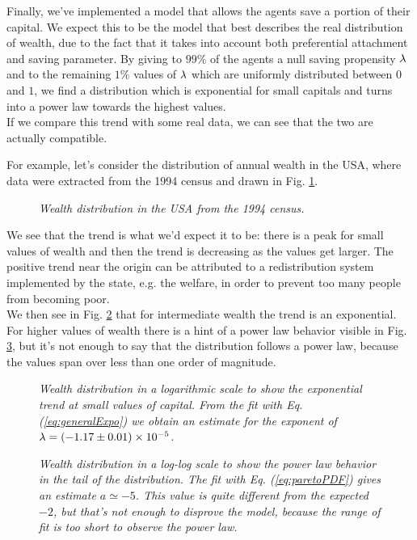 Finally, we've implemented a model that allows the agents save a portion of their capital.
We expect this to be the model that best describes the real distribution of wealth, due to the fact that it takes into account both preferential attachment and saving parameter.
By giving to $99 \%$ of the agents a null saving propensity $\lambda$ and to the remaining $1 \%$ values of $\lambda$ which are uniformly distributed between $0$ and $1$, we find a distribution which is exponential for small capitals and turns into a power law towards the highest values. \\
If we compare this trend with some real data, we can see that the two are actually compatible.

For example, let's consider the distribution of annual wealth in the USA, where data were extracted from the 1994 census and drawn in Fig. \ref{fig:gloabl_realData}.
\begin{figure}[H]
    \centering
    \scalebox{.7}{}
    \caption{\emph{Wealth distribution in the USA from the 1994 census.}}
    \label{fig:gloabl_realData}
\end{figure}
We see that the trend is what we'd expect it to be: there is a peak for small values of wealth and then the trend is decreasing as the values get larger.
The positive trend near the origin can be attributed to a redistribution system implemented by the state, e.g. the welfare, in order to prevent too many people from becoming poor. \\
We then see in Fig. \ref{fig:real_head} that for intermediate wealth the trend is an exponential.
For higher values of wealth there is a hint of a power law behavior visible in Fig. \ref{fig:real_tail}, but it's not enough to say that the distribution follows a power law, because the values span over less than one order of magnitude.
\begin{figure}[H]
    \centering
    \scalebox{.7}{}
	 \caption{\emph{Wealth distribution in a logarithmic scale to show the exponential trend at small values of capital. From the fit with Eq. (\ref{eq:generalExpo}) we obtain an estimate for the exponent of $\lambda = (-1.17 \pm 0.01)\times 10^{-5}$.}}
    \label{fig:real_head}
\end{figure}
\begin{figure}[H]
    \centering
    \scalebox{.7}{}
    \caption{\emph{Wealth distribution in a log-log scale to show the power law behavior in the tail of the distribution. The fit with Eq. (\ref{eq:paretoPDF}) gives an estimate $a \simeq -5$. This value is quite different from the expected $-2$, but that's not enough to disprove the model, because the range of fit is too short to observe the power law.}}
    \label{fig:real_tail}
\end{figure}